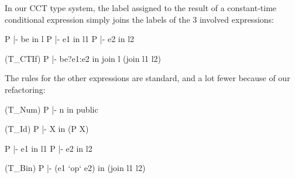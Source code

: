 \documentclass[12pt]{report}
\begin{document}
 In our CCT type system, the label assigned to the result of a constant-time
    conditional expression simply joins the labels of the 3 involved expressions:


        P |- be in l   P |- e1 in l1    P |- e2 in l2
\par
\noindent\hrulefill\par
\noindent{} (T\_CTIf)
             P |- be?e1:e2 in join l (join l1 l2)


    The rules for the other expressions are standard, and a lot fewer
    because of our refactoring:
\par
\noindent\hrulefill\par
\noindent{}   (T\_Num)
            P |- n in public
\par
\noindent\hrulefill\par
\noindent{}   (T\_Id)
            P |- X in (P X)


       P |- e1 in l1      P |- e2 in l2
\par
\noindent\hrulefill\par
\noindent{}   (T\_Bin)
       P |- (e1 `op` e2) in (join l1 l2)
\end{document}
